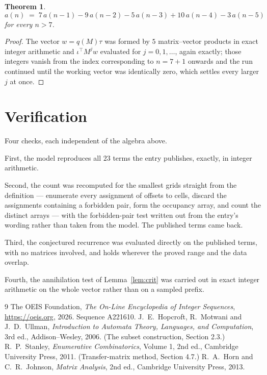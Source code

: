\documentclass[11pt,a4paper]{article}
\theoremstyle{plain}
\newtheorem{theorem}{Theorem}
\theoremstyle{definition}
\begin{document}
\begin{theorem}
\[
a(n)\;=\;7\,a(n-1) - 9\,a(n-2) - 5\,a(n-3) + 10\,a(n-4) - 3\,a(n-5)
\]
for every $n>7$.
\end{theorem}

\begin{proof}
The vector $w=q(M)\tau$ was formed by $5$ matrix--vector products in exact integer
arithmetic and $\iota^{\!\top}M^{j}w$ evaluated for $j=0,1,\dots$, again exactly; those
integers vanish from the index corresponding to $n=7+1$ onwards and the run continued
until the working vector was identically zero, which settles every larger $j$ at once.
\end{proof}

\section{Verification}

Four checks, each independent of the algebra above.

First, the model reproduces all $23$ terms the entry publishes, exactly, in integer
arithmetic.

Second, the count was recomputed for the smallest grids straight from the definition ---
enumerate every assignment of offsets to cells, discard the assignments containing a forbidden
pair, form the occupancy array, and count the distinct arrays --- with the forbidden-pair test
written out from the entry's wording rather than taken from the model. The published terms
came back.

Third, the conjectured recurrence was evaluated directly on the published terms, with no
matrices involved, and holds wherever the proved range and the data overlap.

Fourth, the annihilation test of Lemma~\ref{lem:crit} was carried out in exact integer
arithmetic on the whole vector rather than on a sampled prefix.

\begin{thebibliography}{9}
 The OEIS Foundation, \emph{The On-Line Encyclopedia of Integer
Sequences}, \url{https://oeis.org}, 2026. Sequence A221610.
 J.~E.~Hopcroft, R.~Motwani and J.~D.~Ullman, \emph{Introduction to Automata
Theory, Languages, and Computation}, 3rd ed., Addison--Wesley, 2006. (The subset
construction, Section 2.3.)
 R.~P.~Stanley, \emph{Enumerative Combinatorics}, Volume 1, 2nd ed.,
Cambridge University Press, 2011. (Transfer-matrix method, Section 4.7.)
 R.~A.~Horn and C.~R.~Johnson, \emph{Matrix Analysis}, 2nd ed., Cambridge
University Press, 2013.
\end{thebibliography}
\end{document}
